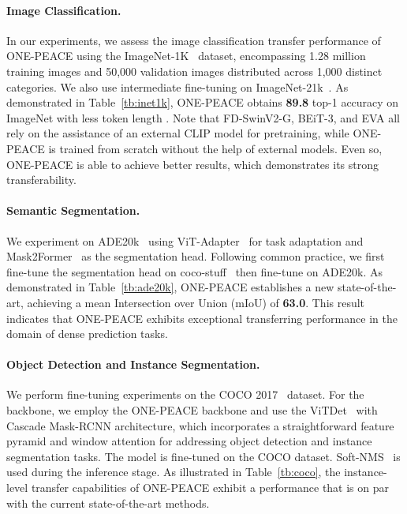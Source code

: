 \documentclass{article}
\newcommand{\onepeace}{ONE-PEACE\xspace}
\begin{document}
\paragraph{Image Classification.} In our experiments, we assess the image classification transfer performance of \onepeace using the ImageNet-1K~\cite{inet1k} dataset, encompassing 1.28 million training images and 50,000 validation images distributed across 1,000 distinct categories. We also use intermediate fine-tuning on ImageNet-21k~\cite{imagenet}. As demonstrated in Table~\ref{tb:inet1k}, \onepeace obtains \textbf{89.8} top-1 accuracy on ImageNet with less token length . 
Note that FD-SwinV2-G, BEiT-3, and EVA all rely on the assistance of an external CLIP model for pretraining, while \onepeace is trained from scratch without the help of external models. Even so, \onepeace is able to achieve better results, which demonstrates its strong transferability.


\paragraph{Semantic Segmentation.} We experiment on ADE20k~\cite{Zhou2016SemanticUO} using ViT-Adapter~\cite{chen2022vitadapter} for task adaptation and Mask2Former~\cite{mask2former} as the segmentation head. Following common practice, we first fine-tune the segmentation head on coco-stuff~\cite{cocostuff} then fine-tune on ADE20k. As demonstrated in Table~\ref{tb:ade20k}, \onepeace establishes a new state-of-the-art, achieving a mean Intersection over Union (mIoU) of \textbf{63.0}. This result indicates that \onepeace exhibits exceptional transferring performance in the domain of dense prediction tasks.

\paragraph{Object Detection and Instance Segmentation.} We perform fine-tuning experiments on the COCO 2017~\cite{mscoco} dataset. For the backbone, we employ the \onepeace backbone and use the ViTDet~\cite{vitdet} with Cascade Mask-RCNN architecture, which incorporates a straightforward feature pyramid and window attention for addressing object detection and instance segmentation tasks. The model is fine-tuned on the COCO dataset. Soft-NMS~\cite{softnms} is used during the inference stage. As illustrated in Table~\ref{tb:coco}, the instance-level transfer capabilities of \onepeace exhibit a performance that is on par with the current state-of-the-art methods. 
\end{document}
